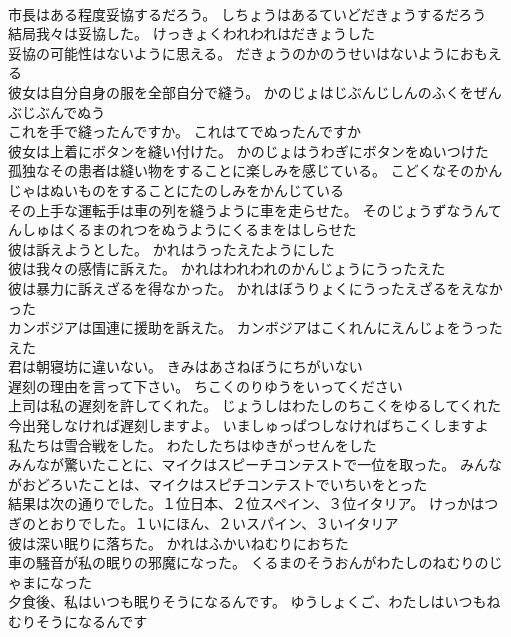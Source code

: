 \documentclass[8pt]{extreport}
\begin{document}
\begin{CJK}{UTF8}{min}
\\	市長はある程度妥協するだろう。	しちょうはあるていどだきょうするだろう 
\\	結局我々は妥協した。	けっきょくわれわれはだきょうした 
\\	妥協の可能性はないように思える。	だきょうのかのうせいはないようにおもえる 
\\	彼女は自分自身の服を全部自分で縫う。	かのじょはじぶんじしんのふくをぜんぶじぶんでぬう 
\\	これを手で縫ったんですか。	これはてでぬったんですか 
\\	彼女は上着にボタンを縫い付けた。	かのじょはうわぎにボタンをぬいつけた 
\\	孤独なその患者は縫い物をすることに楽しみを感じている。	こどくなそのかんじゃはぬいものをすることにたのしみをかんじている 
\\	その上手な運転手は車の列を縫うように車を走らせた。	そのじょうずなうんてんしゅはくるまのれつをぬうようにくるまをはしらせた 
\\	彼は訴えようとした。	かれはうったえたようにした 
\\	彼は我々の感情に訴えた。	かれはわれわれのかんじょうにうったえた 
\\	彼は暴力に訴えざるを得なかった。	かれはぼうりょくにうったえざるをえなかった 
\\	カンボジアは国連に援助を訴えた。	カンボジアはこくれんにえんじょをうったえた 
\\	君は朝寝坊に違いない。	きみはあさねぼうにちがいない 
\\	遅刻の理由を言って下さい。	ちこくのりゆうをいってください 
\\	上司は私の遅刻を許してくれた。	じょうしはわたしのちこくをゆるしてくれた 
\\	今出発しなければ遅刻しますよ。	いましゅっぱつしなければちこくしますよ 
\\	私たちは雪合戦をした。	わたしたちはゆきがっせんをした 
\\	みんなが驚いたことに、マイクはスピーチコンテストで一位を取った。	みんながおどろいたことは、マイクはスピチコンテストでいちいをとった 
\\	結果は次の通りでした。１位日本、２位スペイン、３位イタリア。	けっかはつぎのとおりでした。１いにほん、２いスパイン、３いイタリア 
\\	彼は深い眠りに落ちた。	かれはふかいねむりにおちた 
\\	車の騒音が私の眠りの邪魔になった。	くるまのそうおんがわたしのねむりのじゃまになった 
\\	夕食後、私はいつも眠りそうになるんです。	ゆうしょくご、わたしはいつもねむりそうになるんです 

\end{CJK}
\end{document}
